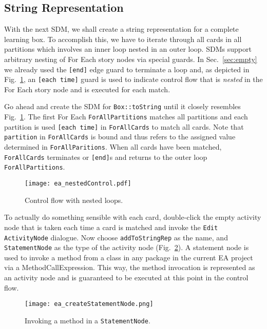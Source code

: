 \subsection{String Representation}

With the next SDM, we shall create a string representation for a complete learning box. To accomplish this, we have to iterate through all cards in all
partitions which involves an inner loop nested in an outer loop. SDMs support arbitrary nesting of For Each story nodes via special guards. In
Sec.~\ref{sec:empty} we already used the \texttt{[end]} edge guard to terminate a loop and, as depicted in Fig.~\ref{fig:sdm_tostring_1}, an
\texttt{[each time]} guard is used to indicate control flow that is \emph{nested} in the For Each story node and is executed for each match.

Go ahead and create the SDM for \texttt{Box::toString} until it closely resembles Fig.~\ref{fig:sdm_tostring_1}. The first For Each \texttt{ForAllPartitions}
matches all partitions and each partition is used \texttt{[each time]} in \texttt{ForAllCards} to match all cards. Note that \texttt{partition} in
\texttt{ForAllCards} is bound  and thus refers to the assigned value determined in \texttt{ForAllParitions}. When all cards have been matched,
\texttt{ForAllCards} terminates or \texttt{[end]}s and returns to the outer loop \texttt{ForAllPartitions}.

\begin{figure}[htbp]
\begin{center}
  \texttt{[image: ea\_nestedControl.pdf]}
  \caption{Control flow with nested loops.}  
  \label{fig:sdm_tostring_1}
\end{center}
\end{figure}

To actually do something sensible with each card, double-click the empty activity node that is taken each time a card is matched and invoke the \texttt{Edit
ActivityNode} dialogue. Now choose \texttt{addToStringRep} as the name, and \texttt{StatementNode} as the type of the activity node
(Fig.~\ref{fig:sdm_tostring_2}).  A statement node is used to invoke a method from a class in any package in the current EA project via a
MethodCallExpression. This way, the method invocation is represented as an activity node and is guaranteed to be executed at this point in the control flow.

\begin{figure}[htbp]
\begin{center}
  \texttt{[image: ea\_createStatementNode.png]}
  \caption{Invoking a method in a \texttt{StatementNode}.}  
  \label{fig:sdm_tostring_2}
\end{center}
\end{figure}

